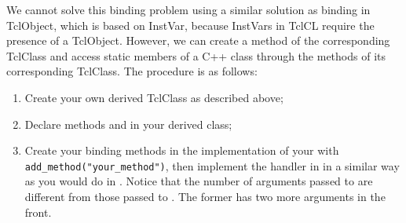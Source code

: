 We cannot solve this binding problem using a similar solution as
binding in TclObject, which is based on InstVar, because InstVars in
TclCL require the presence of a TclObject.
However, we can create a method of the corresponding TclClass and
access static members of a C++ class through the methods of its
corresponding TclClass.
The procedure is as follows:
\begin{enumerate}
\item Create your own derived TclClass as described above;
\item Declare methods  and  in your derived
  class;
\item Create your binding methods in the implementation of your
   with {\tt add\_method("your\_method")}, then implement
  the handler in  in a similar way as you would do in
  . 
  Notice that the number of arguments passed to
   are different from those passed to
  .
  The former has two more arguments in the front. 
\end{enumerate}

